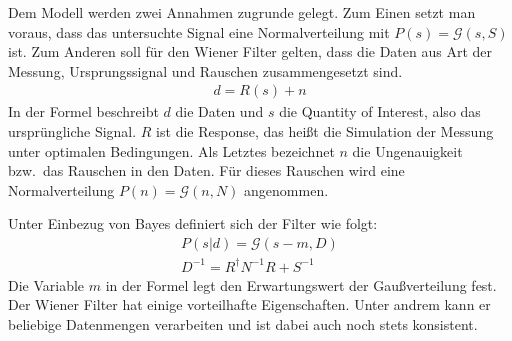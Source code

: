 \documentclass[]{dsadokumentation}
\begin{document}
Dem Modell werden zwei Annahmen zugrunde gelegt.
Zum Einen setzt man voraus, dass das untersuchte Signal eine Normalverteilung mit $P(s) = \mathcal{G}(s,S)$ ist.
Zum Anderen soll für den Wiener Filter gelten, dass die Daten aus Art der Messung, Ursprungssignal und Rauschen zusammengesetzt sind.
\begin{eqnarray}
	d = R(s) + n
\end{eqnarray}
In der Formel beschreibt $d$ die Daten und $s$ die Quantity of Interest, also das ursprüngliche Signal.
$R$ ist die Response, das heißt die Simulation der Messung unter optimalen Bedingungen.
Als Letztes bezeichnet $n$ die Ungenauigkeit bzw.\ das Rauschen in den Daten.
Für dieses Rauschen wird eine Normalverteilung $P(n) = \mathcal{G}(n,N)$ angenommen.

Unter Einbezug von Bayes definiert sich der Filter wie folgt:
\begin{eqnarray}
P(s|d) = \mathcal{G}(s-m,D)\\
D^{-1} = R^{\dagger} N^{-1}R + S^{-1}
\end{eqnarray}
Die Variable $m$ in der Formel legt den Erwartungswert der Gaußverteilung fest.
Der Wiener Filter hat einige vorteilhafte Eigenschaften.
Unter andrem kann er beliebige Datenmengen verarbeiten und ist dabei auch noch stets konsistent.

\printbibliography{}
\end{document}
